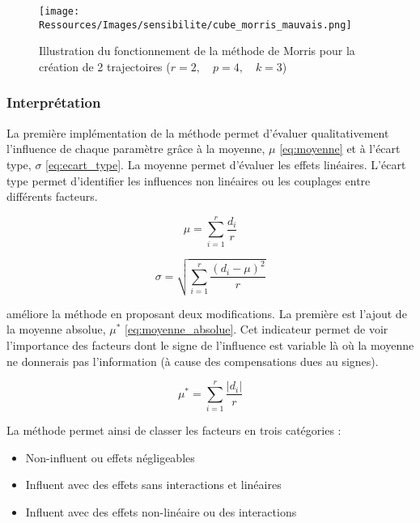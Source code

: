 \begin{figure}
    \begin{center}
        \texttt{[image: Ressources/Images/sensibilite/cube\_morris\_mauvais.png]}
    \end{center}
    \caption{Illustration du fonctionnement de la méthode de Morris pour la création
             de 2 trajectoires ($r = 2, \quad p = 4, \quad k = 3$)
             \label{fig:fonctionnement_morris}}
\end{figure}


\subsubsection{Interprétation} %
\label{ssub:interpretation}
La première implémentation de la méthode permet d’évaluer qualitativement l’influence de chaque
paramètre grâce à la moyenne, $\mu$ \eqref{eq:moyenne} et à l’écart type, $\sigma$ \eqref{eq:ecart_type}.
La moyenne permet d’évaluer les effets linéaires. L’écart type permet d’identifier
les influences non linéaires ou les couplages entre différents facteurs.

\begin{equation}\label{eq:moyenne}
    \mu = \sum_{i = 1}^{r} \frac{d_{i}}{r}
\end{equation}

\begin{equation}\label{eq:ecart_type}
    \sigma = \sqrt{\sum_{i=1}^{r}\frac{(d_{i} - \mu)^{2}}{r}}
\end{equation}

\cite{Campolongo20071509} améliore la méthode en proposant deux modifications. La première
est l’ajout de la moyenne absolue, $\mu^{*}$ \eqref{eq:moyenne_absolue}. Cet indicateur permet
de voir l’importance des facteurs dont le signe de l’influence est variable là où
la moyenne ne donnerais pas l’information (à cause des compensations dues au signes).

\begin{equation}\label{eq:moyenne_absolue}
    \mu^{*} = \sum_{i = 1}^{r} \frac{\lvert d_{i} \rvert}{r}
\end{equation}

La méthode permet ainsi de classer les facteurs en trois catégories :
\begin{itemize}
  \item Non-influent ou effets négligeables
  \item Influent avec des effets sans interactions et linéaires
  \item Influent avec des effets non-linéaire ou des interactions
\end{itemize}

